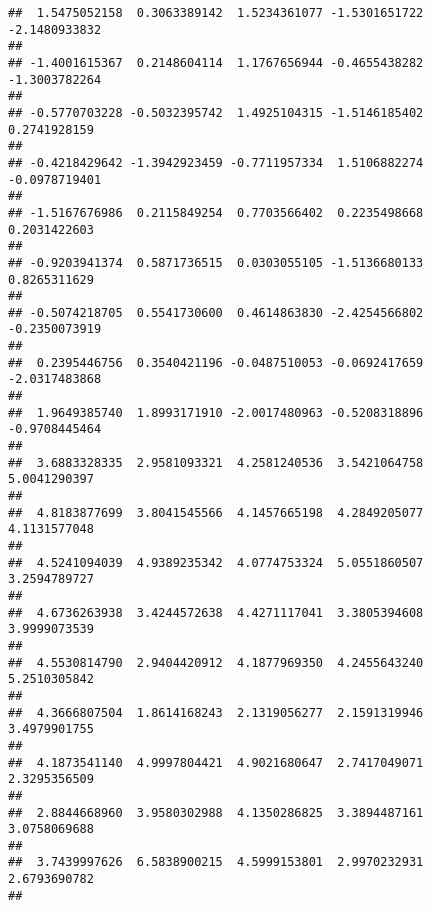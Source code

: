 \documentclass[]{article}
\begin{document}
\begin{verbatim}
##  1.5475052158  0.3063389142  1.5234361077 -1.5301651722 -2.1480933832 
##                                                                       
## -1.4001615367  0.2148604114  1.1767656944 -0.4655438282 -1.3003782264 
##                                                                       
## -0.5770703228 -0.5032395742  1.4925104315 -1.5146185402  0.2741928159 
##                                                                       
## -0.4218429642 -1.3942923459 -0.7711957334  1.5106882274 -0.0978719401 
##                                                                       
## -1.5167676986  0.2115849254  0.7703566402  0.2235498668  0.2031422603 
##                                                                       
## -0.9203941374  0.5871736515  0.0303055105 -1.5136680133  0.8265311629 
##                                                                       
## -0.5074218705  0.5541730600  0.4614863830 -2.4254566802 -0.2350073919 
##                                                                       
##  0.2395446756  0.3540421196 -0.0487510053 -0.0692417659 -2.0317483868 
##                                                                       
##  1.9649385740  1.8993171910 -2.0017480963 -0.5208318896 -0.9708445464 
##                                                                       
##  3.6883328335  2.9581093321  4.2581240536  3.5421064758  5.0041290397 
##                                                                       
##  4.8183877699  3.8041545566  4.1457665198  4.2849205077  4.1131577048 
##                                                                       
##  4.5241094039  4.9389235342  4.0774753324  5.0551860507  3.2594789727 
##                                                                       
##  4.6736263938  3.4244572638  4.4271117041  3.3805394608  3.9999073539 
##                                                                       
##  4.5530814790  2.9404420912  4.1877969350  4.2455643240  5.2510305842 
##                                                                       
##  4.3666807504  1.8614168243  2.1319056277  2.1591319946  3.4979901755 
##                                                                       
##  4.1873541140  4.9997804421  4.9021680647  2.7417049071  2.3295356509 
##                                                                       
##  2.8844668960  3.9580302988  4.1350286825  3.3894487161  3.0758069688 
##                                                                       
##  3.7439997626  6.5838900215  4.5999153801  2.9970232931  2.6793690782 
##                                                                       

\end{verbatim}
\end{document}
